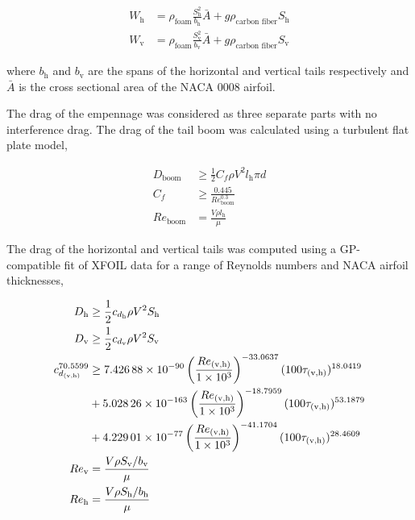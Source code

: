 \documentclass[]{aiaa-tc}%
\begin{document}
\begin{align}
    \label{e:htweight}
    W_{\text{h}} &= \rho_{\text{foam}} \frac{S_{\text{h}}^2}{b_{\text{h}}} \bar{A} + g\rho_{\text{carbon fiber}} S_{\text{h}} \\
    \label{e:vtweight}
    W_{\text{v}} &= \rho_{\text{foam}} \frac{S_{\text{v}}^2}{b_{\text{v}}} \bar{A} + g\rho_{\text{carbon fiber}} S_{\text{v}}
\end{align}

where $b_{\text{h}}$ and $b_{\text{v}}$ are the spans of the horizontal and vertical tails respectively and $\bar{A}$ is the cross sectional area of the NACA 0008 airfoil.

The drag of the empennage was considered as three separate parts with no interference drag.  The drag of the tail boom was calculated using a turbulent flat plate model,

\begin{align}
    \label{e:boomdrag}
    D_{\text{boom}} &\geq \frac{1}{2} C_f \rho V^2 l_{\text{h}}\pi d \\
    C_f &\geq \frac{0.445}{Re_{\text{boom}}^{0.3}} \\
    Re_{\text{boom}} &= \frac{V\rho l_{\text{h}}}{\mu}
\end{align}

The drag of the horizontal and vertical tails was computed using a GP-compatible fit of XFOIL data for a range of Reynolds numbers and NACA airfoil thicknesses,

\begin{align}
    D_{\text{h}} &\geq \frac{1}{2} c_{d_{\text{h}}} \rho V^2 S_{\text{h}} \\
    D_{\text{v}} &\geq \frac{1}{2} c_{d_{\text{v}}} \rho V^2 S_{\text{v}} \\
    \label{e:taildrag}
    c_{d_{\text{(v,h)}}}^{70.5599} &\geq \num{7.42688d-90} \left( \frac{Re_{\text{(v,h)}}}{\num{1d3}} \right)^{-33.0637}(100 \tau_{\text{(v,h)}})^{18.0419}  \nonumber \\
                 & + \num{5.02826d-163}\left(\frac{Re_{\text{(v,h)}}}{\num{1d3}}\right)^{-18.7959} (100\tau_{\text{(v,h)}})^{53.1879} \\
                 &+ \num{4.22901d-77}\left(\frac{Re_{\text{(v,h)}}}{\num{1d3}}\right)^{-41.1704} (100\tau_{\text{(v,h)}})^{28.4609} \nonumber \\
    Re_{\text{v}} &= \frac{V\rho S_{\text{v}}/b_{\text{v}}}{\mu} \\
    Re_{\text{h}} &= \frac{V\rho S_{\text{h}}/b_{\text{h}}}{\mu} 
\end{align}
\end{document}
